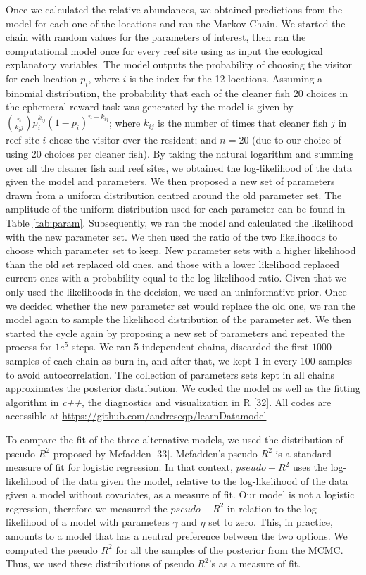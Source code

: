 \documentclass[10pt,letterpaper]{article}
\begin{document}
Once we calculated the relative abundances, we obtained predictions from
the model for each one of the locations and ran the Markov Chain. We
started the chain with random values for the parameters of interest,
then ran the computational model once for every reef site using as input
the ecological explanatory variables. The model outputs the probability
of choosing the visitor for each location \(p_i\), where \(i\) is the
index for the 12 locations. Assuming a binomial distribution, the
probability that each of the cleaner fish 20 choices in the ephemeral
reward task was generated by the model is given by
\(\binom{n}{k_ij}p^{k_{ij}}_i (1-p_i)^{n-k_{ij}}\); where \(k_{ij}\) is
the number of times that cleaner fish \(j\) in reef site \(i\) chose the
visitor over the resident; and \(n=20\) (due to our choice of using 20
choices per cleaner fish). By taking the natural logarithm and summing
over all the cleaner fish and reef sites, we obtained the log-likelihood
of the data given the model and parameters. We then proposed a new set
of parameters drawn from a uniform distribution centred around the old
parameter set. The amplitude of the uniform distribution used for each
parameter can be found in Table \ref{tab:param}. Subsequently, we ran
the model and calculated the likelihood with the new parameter set. We
then used the ratio of the two likelihoods to choose which parameter set
to keep. New parameter sets with a higher likelihood than the old set
replaced old ones, and those with a lower likelihood replaced current
ones with a probability equal to the log-likelihood ratio. Given that we
only used the likelihoods in the decision, we used an uninformative
prior. Once we decided whether the new parameter set would replace the
old one, we ran the model again to sample the likelihood distribution of
the parameter set. We then started the cycle again by proposing a new
set of parameters and repeated the process for \(1e^5\) steps. We ran 5
independent chains, discarded the first \(1000\) samples of each chain
as burn in, and after that, we kept 1 in every 100 samples to avoid
autocorrelation. The collection of parameters sets kept in all chains
approximates the posterior distribution. We coded the model as well as
the fitting algorithm in \emph{c++}, the diagnostics and visualization
in R {[}32{]}. All codes are accessible at
\url{https://github.com/andreseqp/learnDatamodel}

To compare the fit of the three alternative models, we used the
distribution of pseudo \(R^2\) proposed by Mcfadden {[}33{]}. Mcfadden's
pseudo \(R^2\) is a standard measure of fit for logistic regression. In
that context, \(pseudo-R^2\) uses the log-likelihood of the data given
the model, relative to the log-likelihood of the data given a model
without covariates, as a measure of fit. Our model is not a logistic
regression, therefore we measured the \(pseudo-R^2\) in relation to the
log-likelihood of a model with parameters \(\gamma\) and \(\eta\) set to
zero. This, in practice, amounts to a model that has a neutral
preference between the two options. We computed the pseudo \(R^2\) for
all the samples of the posterior from the MCMC. Thus, we used these
distributions of pseudo \(R^2\)'s as a measure of fit.
\end{document}
